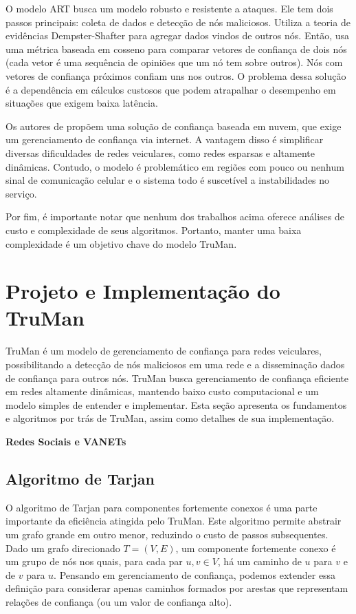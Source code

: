 \begin{resumoextendido}
	O modelo ART \citep{li2016art} busca um modelo robusto e resistente a ataques.
	Ele tem dois passos principais: coleta de dados e detecção de nós maliciosos.
	Utiliza a teoria de evidências Dempster-Shafter para agregar dados vindos de outros nós.
	Então, usa uma métrica baseada em cosseno para comparar vetores de confiança de dois nós (cada vetor é uma sequência de opiniões que um nó tem sobre outros).
	Nós com vetores de confiança próximos confiam uns nos outros.
	O problema dessa solução é a dependência em cálculos custosos que podem atrapalhar o desempenho em situações que exigem baixa latência.
	
	Os autores de \citep{chen2017cloud} propõem uma solução de confiança baseada em nuvem, que exige um gerenciamento de confiança via internet.
	A vantagem disso é simplificar diversas dificuldades de redes veiculares, como redes esparsas e altamente dinâmicas.
	Contudo, o modelo é problemático em regiões com pouco ou nenhum sinal de comunicação celular e o sistema todo é suscetível a instabilidades no serviço.
	
	Por fim, é importante notar que nenhum dos trabalhos acima oferece análises de custo e complexidade de seus algoritmos.
	Portanto, manter uma baixa complexidade é um objetivo chave do modelo TruMan.
	
	\section*{Projeto e Implementação do TruMan}
	
	TruMan é um modelo de gerenciamento de confiança para redes veiculares, possibilitando a detecção de nós maliciosos em uma rede e a disseminação dados de confiança para outros nós.
	TruMan busca gerenciamento de confiança eficiente em redes altamente dinâmicas, mantendo baixo custo computacional e um modelo simples de entender e implementar.
	Esta seção apresenta os fundamentos e algoritmos por trás de TruMan, assim como detalhes de sua implementação.

	\textbf{Redes Sociais e VANETs}
	
	\subsection*{Algoritmo de Tarjan}
	
	O algoritmo de Tarjan para componentes fortemente conexos \citep{tarjan1972depth} é uma parte importante da eficiência atingida pelo TruMan.
	Este algoritmo permite abstrair um grafo grande em outro menor, reduzindo o custo de passos subsequentes.
	Dado um grafo direcionado $T = (V,E)$, um componente fortemente conexo é um grupo de nós nos quais, para cada par $u, v \in V$, há um caminho de $u$ para $v$ e de $v$ para $u$.
	Pensando em gerenciamento de confiança, podemos extender essa definição para considerar apenas caminhos formados por arestas que representam relações de confiança (ou um valor de confiança alto).


\end{resumoextendido}
